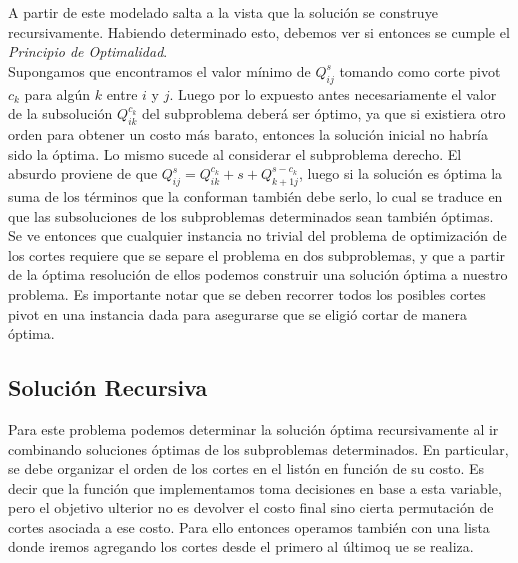 A partir de este modelado salta a la vista que la solución se construye recursivamente. Habiendo determinado esto, debemos ver si entonces se cumple el \textsl{Principio de Optimalidad}.\\
\indent Supongamos que encontramos el valor mínimo de $Q^{s}_{ij}$ tomando como corte pivot $c_k$ para algún $k$ entre $i$ y $j$. Luego por lo expuesto antes necesariamente el valor de la subsolución $Q^{c_k}_{ik}$ del subproblema deberá ser óptimo, ya que si existiera otro orden para obtener un costo más barato, entonces la solución inicial no habría sido la óptima. Lo mismo sucede al considerar el subproblema derecho. El absurdo proviene de que $Q^{s}_{ij} = Q^{c_k}_{ik} + s + Q^{s-c_k}_{k+1j}$, luego si la solución es óptima la suma de los términos que la conforman también debe serlo, lo cual se traduce en que las subsoluciones de los subproblemas determinados sean también óptimas.\\
\indent Se ve entonces que cualquier instancia no trivial del problema de optimización de los cortes requiere que se separe el problema en dos subproblemas, y que a partir de la óptima resolución de ellos podemos construir una solución óptima a nuestro problema. Es importante notar que se deben recorrer todos los posibles cortes pivot en una instancia dada para asegurarse que se eligió cortar de manera óptima.\\

\subsection{Solución Recursiva}

Para este problema podemos determinar la solución óptima recursivamente al ir combinando soluciones óptimas de los subproblemas determinados. En particular, se debe organizar el orden de los cortes en el listón en función de su costo. Es decir que la función que implementamos toma decisiones en base a esta variable, pero el objetivo ulterior no es devolver el costo final sino cierta permutación de cortes asociada a ese costo. Para ello entonces operamos también con una lista donde iremos agregando los cortes desde el primero al últimoq ue se realiza.\\

